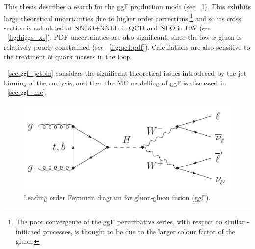 
This thesis describes a search for the ggF production mode (see \Figure~\ref{fig:sig:ggF}). 
This exhibits large theoretical uncertainties due to higher order corrections,\footnote{
	The poor convergence of the ggF perturbative series, with respect to similar 
	\HepProcess{\Pquark\APquark}-initiated processes, is thought to be due to the larger 
	colour factor of the gluon.
}
and so its cross section is calculated at NNLO+NNLL in QCD and NLO in EW (see 
\Figure~\ref{fig:higgs_xs}). PDF uncertainties are also significant, since the low-$x$ gluon 
is relatively poorly constrained (see \Figure~\ref{fig:qcd:pdf}). Calculations are also 
sensitive to the treatment of quark masses in the loop.

\Section~\ref{sec:ggf_jetbin} considers the significant theoretical issues introduced by the 
jet binning of the analysis, and then the MC modelling of ggF is discussed in 
\Section~\ref{sec:ggf_mc}.

\begin{figure}[b]
	\includegraphics[width=\mediumfigwidth]{axodraw/ggf_WWlvlv.pdf}
	\caption{Leading order Feynman diagram for gluon-gluon fusion (ggF).}
	\label{fig:sig:ggF}
\end{figure}
